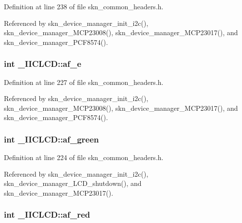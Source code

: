 Definition at line 238 of file skn\+\_\+common\+\_\+headers.\+h.



Referenced by skn\+\_\+device\+\_\+manager\+\_\+init\+\_\+i2c(), skn\+\_\+device\+\_\+manager\+\_\+\+M\+C\+P23008(), skn\+\_\+device\+\_\+manager\+\_\+\+M\+C\+P23017(), and skn\+\_\+device\+\_\+manager\+\_\+\+P\+C\+F8574().

\hypertarget{struct___i_i_c_l_c_d_a896f8305b5c0395ea7f9074904047b32}{
\subsubsection[{af\+\_\+e}]{\setlength{\rightskip}{0pt plus 5cm}int \+\_\+\+I\+I\+C\+L\+C\+D\+::af\+\_\+e}}\label{struct___i_i_c_l_c_d_a896f8305b5c0395ea7f9074904047b32}


Definition at line 227 of file skn\+\_\+common\+\_\+headers.\+h.



Referenced by skn\+\_\+device\+\_\+manager\+\_\+init\+\_\+i2c(), skn\+\_\+device\+\_\+manager\+\_\+\+M\+C\+P23008(), skn\+\_\+device\+\_\+manager\+\_\+\+M\+C\+P23017(), and skn\+\_\+device\+\_\+manager\+\_\+\+P\+C\+F8574().

\hypertarget{struct___i_i_c_l_c_d_a70176d63c9065d4186f55ae8328a82d3}{
\subsubsection[{af\+\_\+green}]{\setlength{\rightskip}{0pt plus 5cm}int \+\_\+\+I\+I\+C\+L\+C\+D\+::af\+\_\+green}}\label{struct___i_i_c_l_c_d_a70176d63c9065d4186f55ae8328a82d3}


Definition at line 224 of file skn\+\_\+common\+\_\+headers.\+h.



Referenced by skn\+\_\+device\+\_\+manager\+\_\+init\+\_\+i2c(), skn\+\_\+device\+\_\+manager\+\_\+\+L\+C\+D\+\_\+shutdown(), and skn\+\_\+device\+\_\+manager\+\_\+\+M\+C\+P23017().

\hypertarget{struct___i_i_c_l_c_d_aca8ab39cfa9f683b2d03269886a0f633}{
\subsubsection[{af\+\_\+red}]{\setlength{\rightskip}{0pt plus 5cm}int \+\_\+\+I\+I\+C\+L\+C\+D\+::af\+\_\+red}}\label{struct___i_i_c_l_c_d_aca8ab39cfa9f683b2d03269886a0f633}


